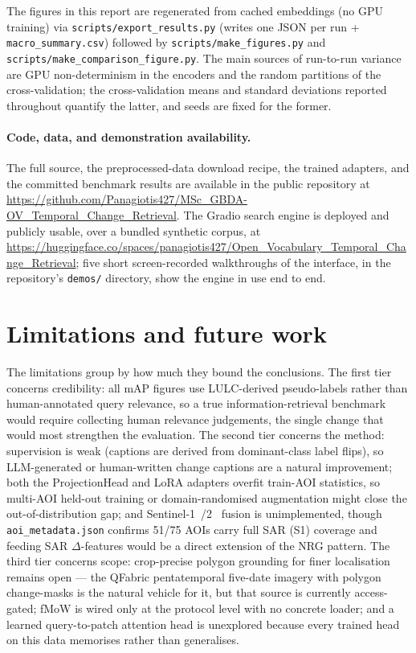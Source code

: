 \documentclass{article}
\begin{document}
The figures in this report are regenerated from cached embeddings (no GPU
training) via \texttt{scripts/\allowbreak{}export\_\allowbreak{}results.py} (writes one JSON per run +
\texttt{macro\_\allowbreak{}summary.csv}) followed by \texttt{scripts/\allowbreak{}make\_\allowbreak{}figures.py} and
\texttt{scripts/\allowbreak{}make\_\allowbreak{}comparison\_\allowbreak{}figure.py}. The main sources of run-to-run
variance are GPU non-determinism in the encoders and the random partitions of the
cross-validation; the cross-validation means and standard deviations reported
throughout quantify the latter, and seeds are fixed for the former.

\paragraph{Code, data, and demonstration availability.}
The full source, the preprocessed-data download recipe, the trained adapters, and
the committed benchmark results are available in the public repository at
\url{https://github.com/Panagiotis427/MSc_GBDA-OV_Temporal_Change_Retrieval}. The
Gradio search engine is deployed and publicly usable, over a bundled synthetic
corpus, at
\url{https://huggingface.co/spaces/panagiotis427/Open_Vocabulary_Temporal_Change_Retrieval};
five short screen-recorded walkthroughs of the interface, in the repository's
\texttt{demos/} directory, show the engine in use end to end.


\section{Limitations and future work}
\label{sec:future}

The limitations group by how much they bound the conclusions. The first tier
concerns credibility: all mAP figures use LULC-derived pseudo-labels rather than
human-annotated query relevance, so a true information-retrieval benchmark would
require collecting human relevance judgements, the single change that would most
strengthen the evaluation. The second tier concerns the method: supervision is
weak (captions are derived from dominant-class label flips), so LLM-generated or
human-written change captions are a natural improvement; both the ProjectionHead
and LoRA adapters overfit train-AOI statistics, so multi-AOI held-out training or
domain-randomised augmentation might close the out-of-distribution gap; and
Sentinel-1~\cite{sentinel1}/2~\cite{sentinel2} fusion is unimplemented, though
\texttt{aoi\_metadata.json} confirms 51/75 AOIs carry full SAR (S1) coverage and
feeding SAR $\Delta$-features would be a direct extension of the NRG pattern. The
third tier concerns scope: crop-precise polygon grounding for finer localisation
remains open --- the QFabric pentatemporal five-date imagery with polygon
change-masks is the natural vehicle for it, but that source is currently
access-gated; fMoW is wired only at the protocol level with no concrete loader;
and a learned query-to-patch attention head is unexplored because every trained
head on this data memorises rather than generalises.
\end{document}
